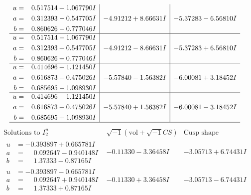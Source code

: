\documentclass[1p]{elsarticle_modified}
\theoremstyle{definition}
\newcommand{\I}{\sqrt{-1}}
\begin{document}
$$\begin{array}{c|c|c}
\begin{aligned}
u &= \phantom{-}0.517514 + 1.067790 I \\
a &= \phantom{-}0.312393 - 0.547705 I \\
b &= \phantom{-}0.860626 - 0.777046 I\end{aligned}
 & -4.91212 + 8.66631 I & -5.37283 - 6.56810 I \\ \hline\begin{aligned}
u &= \phantom{-}0.517514 - 1.067790 I \\
a &= \phantom{-}0.312393 + 0.547705 I \\
b &= \phantom{-}0.860626 + 0.777046 I\end{aligned}
 & -4.91212 - 8.66631 I & -5.37283 + 6.56810 I \\ \hline\begin{aligned}
u &= \phantom{-}0.414696 + 1.121450 I \\
a &= \phantom{-}0.616873 - 0.475026 I \\
b &= \phantom{-}0.685695 - 1.098930 I\end{aligned}
 & -5.57840 - 1.56382 I & -6.00081 + 3.18452 I \\ \hline\begin{aligned}
u &= \phantom{-}0.414696 - 1.121450 I \\
a &= \phantom{-}0.616873 + 0.475026 I \\
b &= \phantom{-}0.685695 + 1.098930 I\end{aligned}
 & -5.57840 + 1.56382 I & -6.00081 - 3.18452 I\\
 \hline 
 \end{array}$$\newpage$$\begin{array}{c|c|c}  
\text{Solutions to }I^u_{2}& \I (\text{vol} + \sqrt{-1}CS) & \text{Cusp shape}\\
 \hline 
\begin{aligned}
u &= -0.393897 + 0.665781 I \\
a &= \phantom{-}0.092647 - 0.940148 I \\
b &= \phantom{-}1.37333 - 0.87165 I\end{aligned}
 & -0.11330 - 3.36458 I & -3.05713 + 6.74431 I \\ \hline\begin{aligned}
u &= -0.393897 - 0.665781 I \\
a &= \phantom{-}0.092647 + 0.940148 I \\
b &= \phantom{-}1.37333 + 0.87165 I\end{aligned}
 & -0.11330 + 3.36458 I & -3.05713 - 6.74431 I \\ \hline\begin{aligned}

\end{aligned}
\end{array}$$
\end{document}
